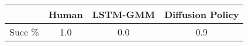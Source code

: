 \begin{tabular}{c|c|c|c}
\toprule
        & Human & LSTM-GMM & Diffusion Policy \\
\midrule
Succ \% & 1.0   & 0.0      & 0.9             \\
\bottomrule
\end{tabular}
